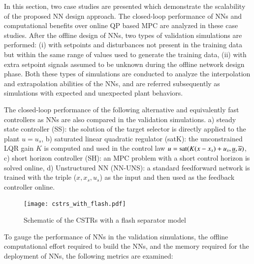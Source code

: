 \documentclass[preprint,5p, twocolumn, authoryear]{elsarticle}
\begin{document}
In this section, two case studies are presented 
which demonstrate the 
scalability of the proposed NN design approach.
The closed-loop performance of NNs and computational benefits over 
online QP based MPC are analyzed in these case studies.
After the offline design of NNs,
two types of validation simulations 
are performed: (i) with setpoints 
and disturbances not present in the training 
data but within the same range of values used to 
generate the training data, (ii) with extra setpoint 
signals assumed to be
unknown during the offline network design phase.
Both these types of simulations are conducted to 
analyze the interpolation and extrapolation 
abilities of the NNs, and are referred subsequently as 
simulations with expected and unexpected plant behaviors.

The closed-loop performance of the 
following alternative and 
equivalently fast controllers as NNs are also compared
in the validation simulations.
a) steady state controller (SS): the solution
of the target selector is directly applied to the plant 
$u = u_s$, b) saturated linear quadratic regulator (satK):
the unconstrained LQR gain 
$K$ is computed and used in the control law 
$u = \textnormal{sat}(K(x-x_s) + u_s, \underline{u}, \overline{u})$,
c) short horizon controller (SH): an MPC problem
with a short control horizon is solved online, 
d) Unstructured NN (NN-UNS): a standard feedforward network is 
trained with the triple ($x, x_s, u_s$) as the input
and then used as the feedback controller online.

\begin{figure}[h]
    \centering
    \texttt{[image: cstrs\_with\_flash.pdf]}
    \caption{Schematic of the CSTRs with a flash separator model}
    \label{fig:schematic_cstrs}
\end{figure}

To gauge the performance of NNs in 
the validation simulations, the offline
computational effort required to build the NNs, 
and the memory required for the deployment of NNs,
the following metrics are examined:
\end{document}
